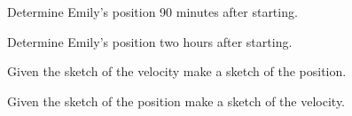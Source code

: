 \begin{problem}
\begin{subproblem}
    \item Determine Emily's position 90 minutes after starting.
      \vspace{3em}

    \item Determine Emily's position two hours after starting.
      \vspace{3em}


  \end{subproblem}


  \clearpage

\item Given the sketch of the velocity make a sketch of the position.

  \scalebox{0.65}{}

\item Given the sketch of the position make a sketch of the velocity.

  \scalebox{0.65}{}

\end{problem}




